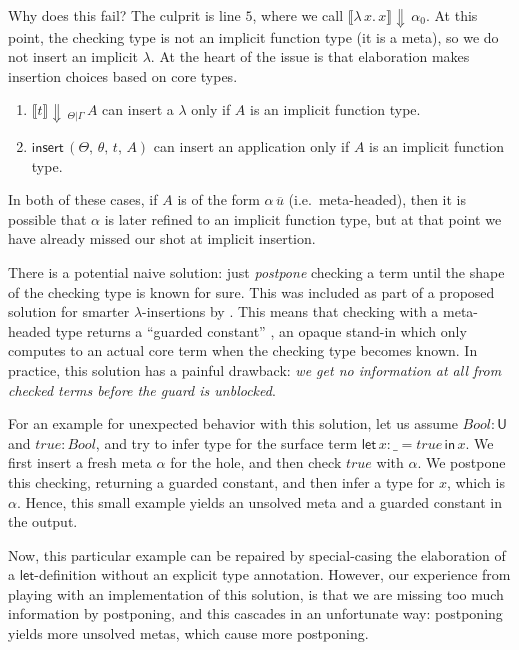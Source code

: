 \documentclass[acmsmall,screen,dvipsnames]{acmart}\settopmatter{}
\newcommand{\slet}{\boldsymbol{\mathsf{let}}}
\renewcommand{\sin}{\boldsymbol{\mathsf{in}}}
\renewcommand{\U}{\mathsf{U}}
\newcommand{\mi}[1]{\mathit{#1}}
\newcommand{\echeck}[4]{\llbracket#1\rrbracket\!\Downarrow\,_{#2|#3}\,#4}
\newcommand{\echeckt}[2]{\llbracket#1\rrbracket\!\Downarrow\,#2}
\newcommand{\einsert}{\mathsf{insert}}
\theoremstyle{remark}
\begin{document}
Why does this fail? The culprit is line $\scriptstyle{5}$, where we call
$\echeckt{\lambda\,x.\,x}{\alpha_0}$. At this point, the checking type is not an
implicit function type (it is a meta), so we do not insert an implicit
$\lambda$. At the heart of the issue is that elaboration makes insertion choices
based on core types.
\begin{enumerate}
\item $\echeck{t}{\Theta}{\Gamma}{A}$ can insert a $\lambda$ only if $A$ is an implicit function type.
\item $\einsert\,(\Theta,\,\theta,\,t,\,A)$ can insert an application only if
  $A$ is an implicit function type.
\end{enumerate}
In both of these cases, if $A$ is of the form $\alpha\,\overline{u}$
(i.e.\ meta-headed), then it is possible that $\alpha$ is later refined to an
implicit function type, but at that point we have already missed our shot at
implicit insertion.

There is a potential naive solution: just \emph{postpone} checking a term until
the shape of the checking type is known for sure. This was included as part of a
proposed solution for smarter $\lambda$-insertions by
\cite{johansson2015eliminating}. This means that checking with a meta-headed
type returns a ``guarded constant'' \cite[Chapter~3]{norell07thesis}, an opaque
stand-in which only computes to an actual core term when the checking type
becomes known. In practice, this solution has a painful drawback: \emph{we get
  no information at all from checked terms before the guard is unblocked}.

For an example for unexpected behavior with this solution, let us assume $\mi{Bool} :
\U$ and $\mi{true} : \mi{Bool}$, and try to infer type for the surface term $\slet\,x : \_
= \mi{true}\,\sin\, x$. We first insert a fresh meta $\alpha$ for the hole, and then
check $\mi{true}$ with $\alpha$. We postpone this checking, returning a guarded
constant, and then infer a type for $x$, which is $\alpha$. Hence, this small
example yields an unsolved meta and a guarded constant in the output.

Now, this particular example can be repaired by special-casing the elaboration
of a $\slet$-definition without an explicit type annotation. However, our
experience from playing with an implementation of this solution, is that we are
missing too much information by postponing, and this cascades in an unfortunate
way: postponing yields more unsolved metas, which cause more postponing.
\end{document}
